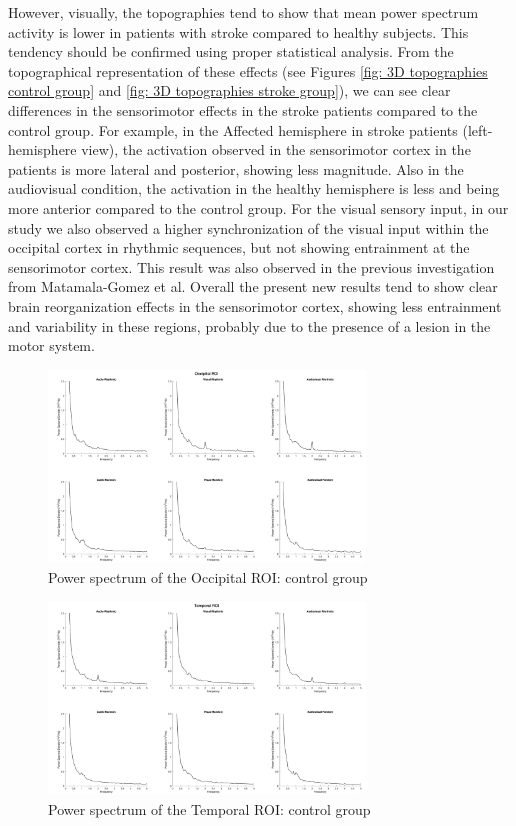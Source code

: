 However, visually, the topographies tend to show that mean power spectrum activity is lower in patients with stroke compared to healthy subjects. This tendency should be confirmed using proper statistical analysis. From the topographical representation of these effects (see Figures \ref{fig: 3D topographies control group} and \ref{fig: 3D topographies stroke group}), we can see clear differences in the sensorimotor effects in the stroke patients compared to the control group. For example, in the Affected hemisphere in stroke patients (left-hemisphere view), the activation observed in the sensorimotor cortex in the patients is more lateral and posterior, showing less magnitude. Also in the audiovisual condition, the activation in the healthy hemisphere is less and being more anterior compared to the control group. 
For the visual sensory input, in our study we also observed a higher synchronization of the visual input within the occipital cortex in rhythmic sequences, but not showing entrainment at the sensorimotor cortex. This result was also observed in the previous investigation from Matamala-Gomez et al. 
Overall the present new results tend to show clear brain reorganization effects in the sensorimotor cortex, showing less entrainment and variability in these regions, probably due to the presence of a lesion in the motor system.  
\begin{figure}[htbp]
    \centering
    \includegraphics[width=0.75\textwidth]{healthy_images/occipitalROI_graph.png}
        \caption{Power spectrum of the Occipital ROI: control group}
        \label{fig: Waveforms control: occipital} 
\end{figure}
\begin{figure}[htbp]
    \centering
        \includegraphics[width=0.75\textwidth]{healthy_images/temporalROI_graph.png}
        \caption{Power spectrum of the Temporal ROI: control group}
        \label{fig: Waveforms control: temporal}   
\end{figure}
